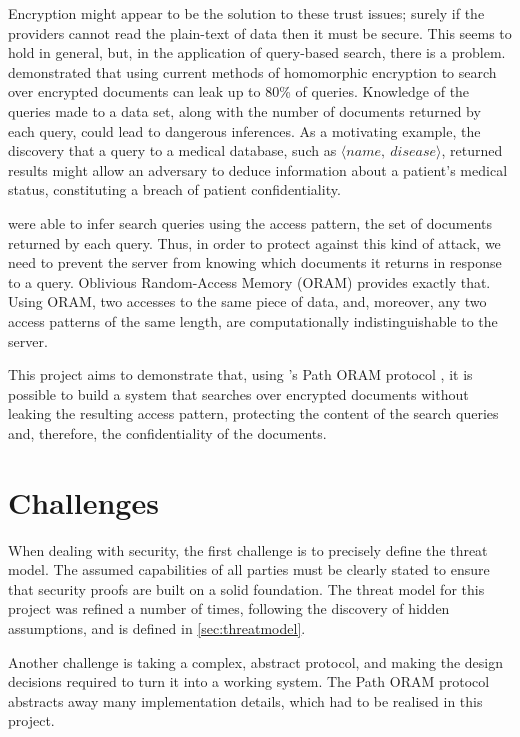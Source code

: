 \documentclass[12pt,a4paper,twoside,openright]{report}
\begin{document}
Encryption might appear to be the solution to these trust issues; surely if the providers cannot read the plain-text of data then it must be secure. This seems to hold in general, but, in the application of query-based search, there is a problem. \citet{islam2012access} demonstrated that using current methods of homomorphic encryption to search over encrypted documents can leak up to 80\% of queries. Knowledge of the queries made to a data set, along with the number of documents returned by each query, could lead to dangerous inferences. As a motivating example, the discovery that a query to a medical database, such as $\langle name,~disease\rangle$, returned results might allow an adversary to deduce information about a patient's medical status, constituting a breach of patient confidentiality.

\citet{islam2012access} were able to infer search queries using the access pattern, the set of documents returned by each query. Thus, in order to protect against this kind of attack, we need to prevent the server from knowing which documents it returns in response to a query. Oblivious Random-Access Memory (ORAM) provides exactly that. Using ORAM, two accesses to the same piece of data, and, moreover, any two access patterns of the same length, are computationally indistinguishable to the server.

This project aims to demonstrate that, using \citeauthor{stefanov2013path}'s Path ORAM protocol \cite{stefanov2013path}, it is possible to build a system that searches over encrypted documents without leaking the resulting access pattern, protecting the content of the search queries and, therefore, the confidentiality of the documents.

\section{Challenges}

When dealing with security, the first challenge is to precisely define the threat model. The assumed capabilities of all parties must be clearly stated to ensure that security proofs are built on a solid foundation. The threat model for this project was refined a number of times, following the discovery of hidden assumptions, and is defined in \cref{sec:threatmodel}.

Another challenge is taking a complex, abstract protocol, and making the design decisions required to turn it into a working system. The Path ORAM protocol abstracts away many implementation details, which had to be realised in this project.
\end{document}
